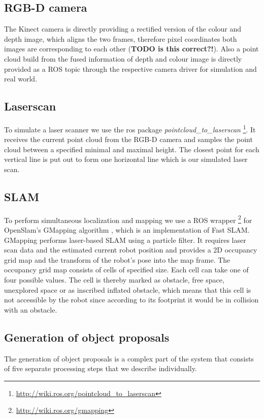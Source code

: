 \documentclass[a4paper,11pt,english]{article}
\begin{document}
\subsection{RGB-D camera}
The Kinect camera is directly providing a rectified version of the colour and depth image, which aligns the two frames, therefore pixel coordinates both images are corresponding to each other (\textbf{TODO is this correct?!}).
Also a point cloud build from the fused information of depth and colour image is directly provided as a ROS topic through the respective camera driver for simulation and real world.

\subsection{Laserscan}
To simulate a laser scanner we use the ros package \textit{pointcloud\_to\_laserscan} \footnote{\url{http://wiki.ros.org/pointcloud_to_laserscan}}.
It receives the current point cloud from the RGB-D camera and samples the point cloud between a specified minimal and maximal height.
The closest point for each vertical line is put out to form one horizontal line which is our simulated laser scan.

\subsection{SLAM}
To perform simultaneous localization and mapping we use a ROS wrapper \footnote{\url{http://wiki.ros.org/gmapping}} for OpenSlam's GMapping algorithm \cite{grisetti2007}, which is an implementation of Fast SLAM.
GMapping performs laser-based SLAM using a particle filter.
It requires laser scan data and the estimated current robot position and provides a 2D occupancy grid map and the transform of the robot's pose into the map frame.
The occupancy grid map consists of cells of specified size.
Each cell can take one of four possible values.
The cell is thereby marked as obstacle, free space, unexplored space or as inscribed inflated obstacle, which means that this cell is not accessible by the robot since according to its footprint it would be in collision with an obstacle.

\subsection{Generation of object proposals}
The generation of object proposals is a complex part of the system that consists of five separate processing steps that we describe individually.
\end{document}
